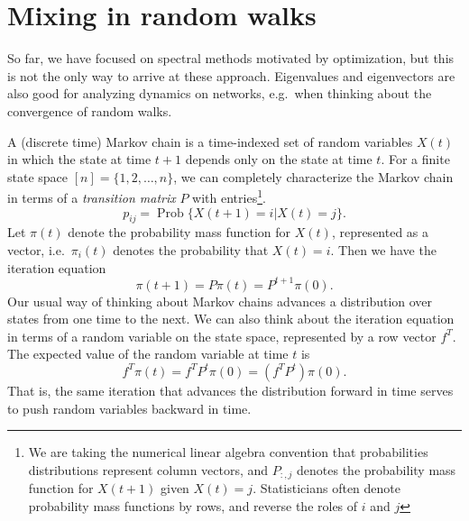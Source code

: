 \documentclass[12pt, leqno]{article} %
\begin{document}
\section{Mixing in random walks}


So far, we have focused on spectral methods motivated by optimization,
but this is not the only way to arrive at these approach.  Eigenvalues
and eigenvectors are also good for analyzing dynamics on networks,
e.g.~when thinking about the convergence of random walks.

A (discrete time) Markov chain is a time-indexed set of random
variables $X(t)$ in which the state at time $t+1$ depends only on the
state at time $t$.  For a finite state space $[n] = \{1, 2, \ldots, n\}$,
we can completely characterize the Markov chain in terms of a
{\em transition matrix} $P$ with entries\footnote{We are taking
  the numerical linear algebra convention that probabilities
  distributions represent column vectors, and $P_{:,j}$ denotes the
  probability mass function for $X(t+1)$ given $X(t) = j$.
  Statisticians often denote probability mass functions by rows,
  and reverse the roles of $i$ and $j$}.
\[
  p_{ij} = \operatorname{Prob}\{ X(t+1) = i | X(t) = j \}.
\]
Let $\pi(t)$ denote the probability mass function for $X(t)$,
represented as a vector, i.e.~$\pi_i(t)$ denotes the probability that
$X(t) = i$.  Then we have the iteration equation
\[
  \pi(t+1) = P \pi(t) = P^{t+1} \pi(0).
\]
Our usual way of thinking about Markov chains advances a distribution
over states from one time to the next.  We can also think about the
iteration equation in terms of a random variable on the state space,
represented by a row vector $f^T$.  The expected
value of the random variable at time $t$ is
\[
  f^T \pi(t) = f^T P^{t} \pi(0) = \left( f^T P^{t} \right) \pi(0).
\]
That is, the same iteration that advances
the distribution forward in time serves to push random variables
backward in time.
\end{document}
